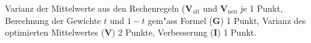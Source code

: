 \begin{bewertung}
Varianz der Mittelwerte aus den Rechenregeln ($\textbf{V}_{\text{alt}}$ und
$\textbf{V}_{\text{neu}}$ je 1 Punkt,
Berechnung der Gewichte $t$ und $1-t$ gem"ass Formel ({\bf G}) 1 Punkt,
Varianz des optimierten Mittelwertes ({\bf V}) 2 Punkte,
Verbesserung ({\bf I}) 1 Punkt.
\end{bewertung}


